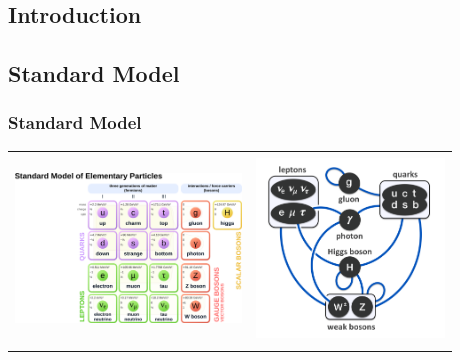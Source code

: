 \documentclass[11pt]{beamer}
\begin{document}

\begin{frame}
\section{Introduction}
\subsection{Standard Model}
\frametitle{Standard Model}
\begin{table}
	\centering
\begin{tabular}{cc}
\includegraphics[width=6cm,height=5cm]{figures/sm1.png} & \includegraphics[width=5cm,height=5cm]{figures/sm.png}
\end{tabular}
\end{table}
\end{frame}
\end{document}
